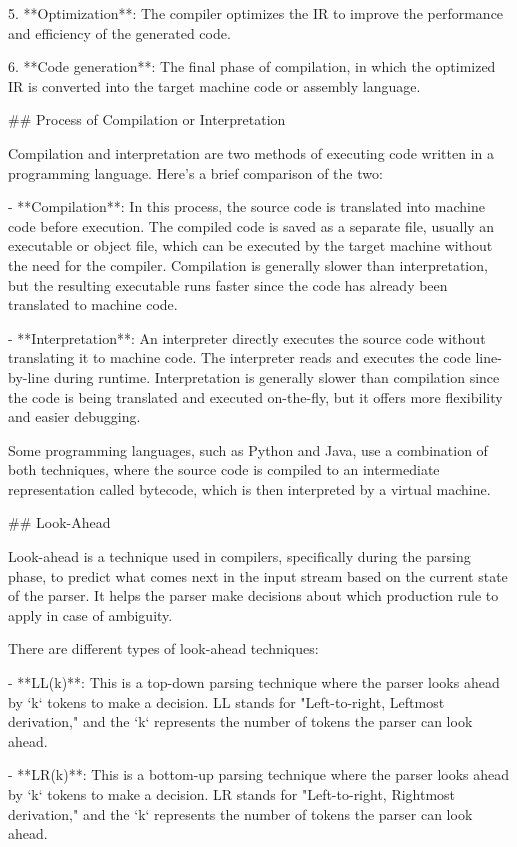 \documentclass{article}
\begin{document}
5. **Optimization**: The compiler optimizes the IR to improve the performance and efficiency of the generated code.

6. **Code generation**: The final phase of compilation, in which the optimized IR is converted into the target machine code or assembly language.

## Process of Compilation or Interpretation

Compilation and interpretation are two methods of executing code written in a programming language. Here's a brief comparison of the two:

- **Compilation**: In this process, the source code is translated into machine code before execution. The compiled code is saved as a separate file, usually an executable or object file, which can be executed by the target machine without the need for the compiler. Compilation is generally slower than interpretation, but the resulting executable runs faster since the code has already been translated to machine code.

- **Interpretation**: An interpreter directly executes the source code without translating it to machine code. The interpreter reads and executes the code line-by-line during runtime. Interpretation is generally slower than compilation since the code is being translated and executed on-the-fly, but it offers more flexibility and easier debugging.

Some programming languages, such as Python and Java, use a combination of both techniques, where the source code is compiled to an intermediate representation called bytecode, which is then interpreted by a virtual machine.

## Look-Ahead

Look-ahead is a technique used in compilers, specifically during the parsing phase, to predict what comes next in the input stream based on the current state of the parser. It helps the parser make decisions about which production rule to apply in case of ambiguity.

There are different types of look-ahead techniques:

- **LL(k)**: This is a top-down parsing technique where the parser looks ahead by `k` tokens to make a decision. LL stands for "Left-to-right, Leftmost derivation," and the `k` represents the number of tokens the parser can look ahead.

- **LR(k)**: This is a bottom-up parsing technique where the parser looks ahead by `k` tokens to make a decision. LR stands for "Left-to-right, Rightmost derivation," and the `k` represents the number of tokens the parser can look ahead.
\end{document}
